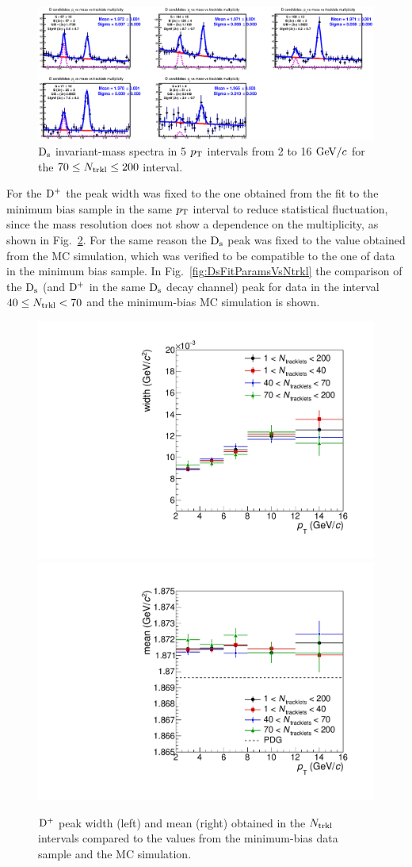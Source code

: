 \begin{figure}[htpb]
\centering
 \includegraphics[width=.9\textwidth]{FigCap6/DsMass70200.eps}
 \caption{${\rm D_s}$ invariant-mass spectra in 5 $p_{\rm T}$ intervals from 2 to 16 $\mathrm{GeV}/c$ for the $70 \leq N_{\rm trkl} \leq 200$ interval.}
 \label{fig:DsInvMassVsNtrkl_3}
\end{figure}

For the ${\rm D^+}$ the peak width was fixed to the one obtained from the fit to the minimum bias sample in the same $p_{\rm T}$ interval to reduce statistical fluctuation, since the mass resolution does not show a dependence on the multiplicity, as shown in Fig.~\ref{fig:DplusFitParamsVsNtrkl}. For the same reason the ${\rm D_s}$ peak was fixed to the value obtained from the MC simulation, which was verified to be compatible to the one of data in the minimum bias sample. In Fig.~\ref{fig:DsFitParamsVsNtrkl} the comparison of the ${\rm D_s}$ (and ${\rm D^+}$ in the same ${\rm D_s}$ decay channel) peak for  data in the interval $40 \leq N_{\rm trkl} < 70$ and the minimum-bias MC simulation is shown. 

\begin{figure}[htpb]
\centering
 \includegraphics[width=.45\textwidth]{FigCap6/Sigma_Ntrklts_1_40_70_200_Pt_2_4_6_8_12_16.pdf}
 \includegraphics[width=.45\textwidth]{FigCap6/Mean_Ntrklts_1_40_70_200_Pt_2_4_6_8_12_16.pdf}
  \caption{${\rm D^+}$ peak width (left) and mean (right) obtained in the $N_{\rm trkl}$ intervals compared to the values from the minimum-bias data sample and the MC simulation.}
 \label{fig:DplusFitParamsVsNtrkl}
\end{figure}

